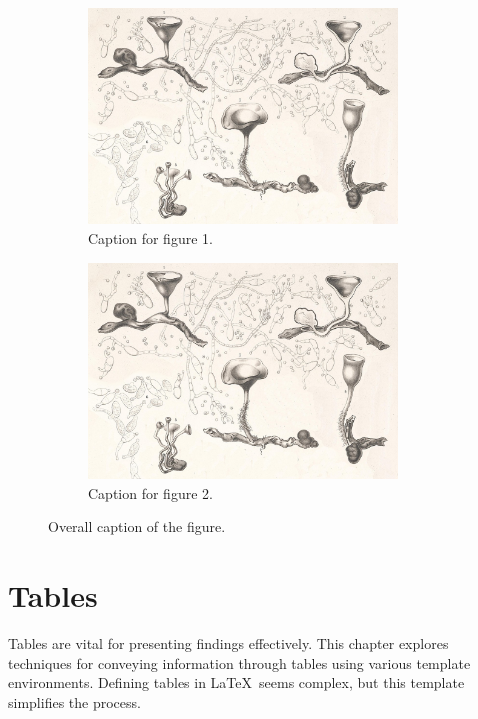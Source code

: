 {\begin{figure}[!htpb]
    \centering
    \begin{subfigure}{0.45\textwidth}
        \centering
        \includegraphics[width=0.9\textwidth]{Figures/PezizaTuberosa.jpg}
        \caption{Caption for figure 1.}
        \label{fig:figure-02.1}
    \end{subfigure}
    \hspace{.5cm} %
    \begin{subfigure}{0.45\textwidth}
        \centering
        \includegraphics[width=0.9\textwidth]{Figures/PezizaTuberosa.jpg}
        \caption{Caption for figure 2.}
        \label{fig:figure-02.2}
    \end{subfigure}
    \caption{Overall caption of the figure.}
    \label{fig:figure-02}
\end{figure}

\section{Tables}
Tables are vital for presenting findings effectively. This chapter explores techniques for conveying information through tables using various template environments. Defining tables in \LaTeX\ seems complex, but this template simplifies the process.

}
